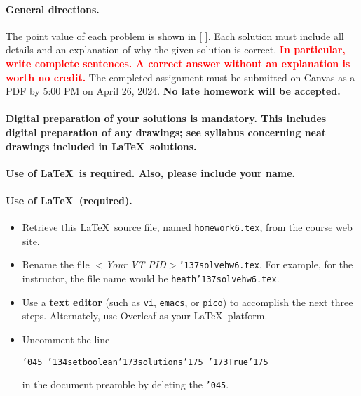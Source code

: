 \documentclass[11pt,twoside]{article}
\newcommand{\mybackslash}{\char'134}
\newcommand{\myleftbracket}{\char'173}
\newcommand{\myrightbracket}{\char'175}
\newcommand{\mypercent}{\char'045}
\newcommand{\myunderscore}{\char'137}
\newcommand{\duedate}{April 26, 2024}
\newcommand{\homeworknumber}{6}
\newcounter{problem}
\begin{document}
{
\begingroup %
\paragraph{General directions.}
The point value of each problem is shown in [ ].
Each solution must include all details and
an explanation of why the given solution is correct.
\textbf{\textcolor{red}{In particular,
write complete sentences.
A correct answer without an explanation is worth no credit.}}
The completed assignment must be submitted on Canvas as a PDF by 5:00 PM
on \duedate.
\textbf{No late homework will be accepted.}

\paragraph{Digital preparation of your solutions is mandatory.
This includes digital preparation of any drawings; see syllabus
concerning neat drawings included in \LaTeX\ solutions.}
\textbf{Use of \LaTeX\ is required.
Also,
please include your name.}

\paragraph{Use of \LaTeX\ (required).}
\begin{itemize}
\item Retrieve this \LaTeX\ source file,
named
\texttt{homework\homeworknumber.tex},
from the course web site.
\item Rename the file
\textit{$<$Your VT PID$>$}\texttt{{\myunderscore}solvehw\homeworknumber.tex},
For example,
for the instructor,
the file name would be
\texttt{heath{\myunderscore}solvehw\homeworknumber.tex}.

\item
Use a \textbf{text editor}
(such as \texttt{vi}, \texttt{emacs}, or \texttt{pico})
to accomplish the next three steps.
Alternately,
use Overleaf as your \LaTeX\ platform.

\item
Uncomment the line

\texttt{{\mypercent} 
{\mybackslash}setboolean{\myleftbracket}solutions{\myrightbracket}%
{\myleftbracket}True{\myrightbracket}}

in the document preamble by deleting the \texttt{\mypercent}.


\end{itemize}}
\end{document}
